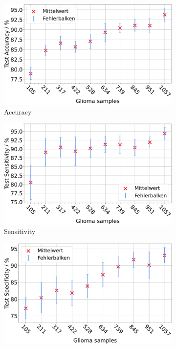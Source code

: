 \begin{figure}[htbp]
  \centering
  \begin{subfigure}[b]{0.48\textwidth}
    \centering
    \includegraphics[width=\textwidth]{plots/Reduzierung-Gli + Balnce_Accuracy_mean.pdf}
    \caption{Accuracy}
    \label{fig:gli-red-acc}
  \end{subfigure}
  \begin{subfigure}[b]{0.48\textwidth}
    \centering
    \includegraphics[width=\textwidth]{plots/Reduzierung-Gli + Balnce_Sensitivity_mean.pdf}
    \caption{Sensitivity}
    \label{fig:gli-red-sens}
  \end{subfigure}
  \begin{subfigure}[b]{0.48\textwidth}
    \centering
    \includegraphics[width=\textwidth]{plots/Reduzierung-Gli + Balnce_Specificity_mean.pdf}

\end{subfigure}
\end{figure}
